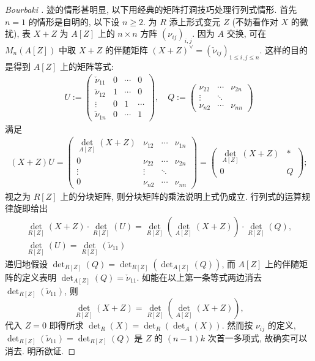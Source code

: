 \begin{proof}[{Bourbaki {\cite[III.112]{Bou-Alg1}}}]
	迹的情形甚明显, 以下用经典的矩阵打洞技巧处理行列式情形. 首先 $n=1$ 的情形是自明的, 以下设 $n \geq 2$. 为 $R$ 添上形式变元 $Z$ (不妨看作对 $X$ 的微扰), 表 $X+Z$ 为 $A[Z]$ 上的 $n \times n$ 方阵 $(\nu_{ij})_{i,j}$. 因为 $A$ 交换, 可在 $M_n(A[Z])$ 中取 $X+Z$ 的伴随矩阵 $(X+Z)^\vee = (\check{\nu}_{ij})_{1 \leq i,j \leq n}$. 这样的目的是得到 $A[Z]$ 上的矩阵等式:
	\begin{gather*} U := \begin{pmatrix}
		\check{\nu}_{11} & 0 & \cdots & 0 \\
		\check{\nu}_{12} & 1 & \cdots & 0 \\
		\vdots & 0 & 1 & \cdots \\
		\check{\nu}_{1n} & 0 & \cdots & 1
	\end{pmatrix}, \quad Q := \begin{pmatrix}
		\nu_{22} & \cdots & \nu_{2n} \\
		\vdots & \ddots & \\
		\nu_{n2} & \cdots & \nu_{nn}
	\end{pmatrix}\end{gather*}
	满足
	\begin{gather*}
	(X+Z) U  = \begin{pmatrix}
		\det_{A[Z]}(X+Z) & \nu_{12} & \cdots & \nu_{1n} \\
		0 & \nu_{22} & \cdots & \nu_{2n} \\
		\vdots & \vdots & \ddots & \\
		0 & \nu_{n2} & \cdots & \nu_{nn}
	\end{pmatrix} = \begin{pmatrix}
		\det_{A[Z]}(X+Z) & \ast \\
		0 & Q
	\end{pmatrix}; \end{gather*}
	视之为 $R[Z]$ 上的分块矩阵, 则分块矩阵的乘法说明上式仍成立. 行列式的运算规律旋即给出
	\begin{gather*}
		\det_{R[Z]}(X+Z) \cdot \det_{R[Z]}(U) = \det_{R[Z]}\left( \det_{A[Z]}(X+Z)\right) \cdot \det_{R[Z]}(Q), \\
		\det_{R[Z]}(U) = \det_{R[Z]}(\check{\nu}_{11})
	\end{gather*}
	递归地假设 $\det_{R[Z]}(Q) = \det_{R[Z]}\left(\det_{A[Z]}(Q)\right)$, 而 $A[Z]$ 上的伴随矩阵的定义表明 $\det_{A[Z]}(Q) = \check{\nu}_{11}$. 如能在以上第一条等式两边消去 $\det_{R[Z]}(\check{\nu}_{11})$, 则
	\[ \det_{R[Z]}(X+Z) = \det_{R[Z]}\left( \det_{A[Z]}(X+Z)\right), \]
	代入 $Z=0$ 即得所求 $\det_R(X) = \det_R(\det_A(X))$. 然而按 $\nu_{ij}$ 的定义, $\det_{R[Z]}(\check{\nu}_{11}) = \det_{R[Z]}(Q)$ 是 $Z$ 的 $(n-1)k$ 次首一多项式, 故确实可以消去. 明所欲证.
\end{proof}


